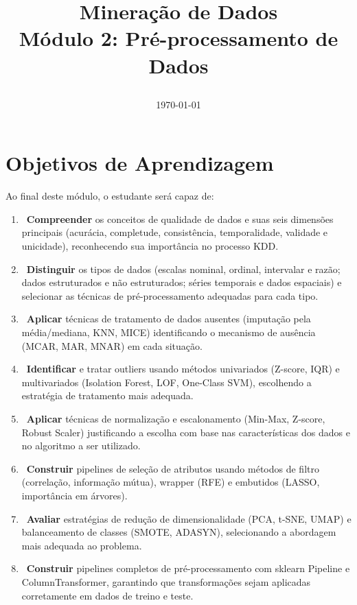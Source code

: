\documentclass[12pt,a4paper]{article}
\title{
\begin{tcolorbox}[colback=mineblue,coltext=white,colframe=mineblue,width=\textwidth,sharp corners]
\centering
\LARGE \faIcon{database} Mineração de Dados\\[4pt]
\Large Módulo 2: Pré-processamento de Dados\\[6pt]
\end{tcolorbox}
}
\author{}
\date{\today}
\begin{document}
\maketitle
\thispagestyle{empty}
\newpage

\tableofcontents
\newpage

\section{Objetivos de Aprendizagem}

Ao final deste módulo, o estudante será capaz de:

\begin{enumerate}[leftmargin=*, label=\textbf{\arabic*.}]
  \item {}~\textbf{Compreender} os conceitos de qualidade de dados e suas seis dimensões principais (acurácia, completude, consistência, temporalidade, validade e unicidade), reconhecendo sua importância no processo KDD.

  \item {}~\textbf{Distinguir} os tipos de dados (escalas nominal, ordinal, intervalar e razão; dados estruturados e não estruturados; séries temporais e dados espaciais) e selecionar as técnicas de pré-processamento adequadas para cada tipo.

  \item {}~\textbf{Aplicar} técnicas de tratamento de dados ausentes (imputação pela média/mediana, KNN, MICE) identificando o mecanismo de ausência (MCAR, MAR, MNAR) em cada situação.

  \item {}~\textbf{Identificar} e tratar outliers usando métodos univariados (Z-score, IQR) e multivariados (Isolation Forest, LOF, One-Class SVM), escolhendo a estratégia de tratamento mais adequada.

  \item {}~\textbf{Aplicar} técnicas de normalização e escalonamento (Min-Max, Z-score, Robust Scaler) justificando a escolha com base nas características dos dados e no algoritmo a ser utilizado.

  \item {}~\textbf{Construir} pipelines de seleção de atributos usando métodos de filtro (correlação, informação mútua), wrapper (RFE) e embutidos (LASSO, importância em árvores).

  \item {}~\textbf{Avaliar} estratégias de redução de dimensionalidade (PCA, t-SNE, UMAP) e balanceamento de classes (SMOTE, ADASYN), selecionando a abordagem mais adequada ao problema.

  \item {}~\textbf{Construir} pipelines completos de pré-processamento com sklearn Pipeline e ColumnTransformer, garantindo que transformações sejam aplicadas corretamente em dados de treino e teste.
\end{enumerate}
\end{document}
